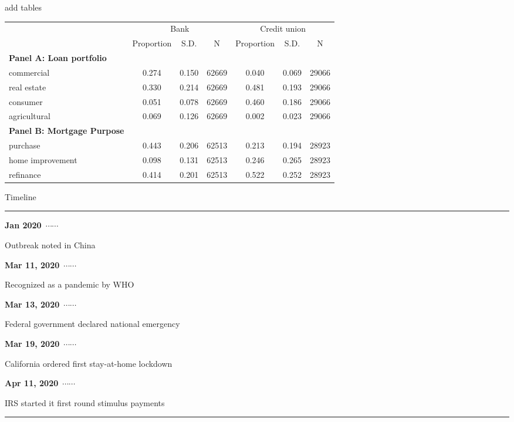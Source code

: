 \documentclass[notes,11pt, aspectratio=169]{beamer}
\newcommand\ytl[2]{
	\parbox[b]{11em}{\hfill{\color{cyan}\bfseries\sffamily #1}~$\cdots\cdots$~}\makebox[0pt][c]{$\bullet$}\vrule\quad \parbox[c]{6cm}{\vspace{8pt}\color{red!40!black!80}\raggedright\sffamily #2}}
\begin{document}
\begin{frame}{add tables}
\begin{table}
\centering
\begin{adjustbox}{max width=0.8\textwidth}
\begin{tabular}{l*{6}{c}}
\toprule
&\multicolumn{3}{c}{Bank}&\multicolumn{3}{c}{Credit union}\\
\cmidrule(lr){2-4}\cmidrule(lr){5-7}
&\multicolumn{1}{c}{Proportion}&\multicolumn{1}{c}{S.D.}&\multicolumn{1}{c}{N}&\multicolumn{1}{c}{Proportion}&\multicolumn{1}{c}{S.D.}&\multicolumn{1}{c}{N} \\
\midrule
  \textbf{Panel A: Loan portfolio} & & & & & & \\
  commercial&       0.274&       0.150&       62669&       0.040&       0.069&       29066\\
  real estate&       0.330&       0.214&       62669&       0.481&       0.193&       29066\\
  consumer&       0.051&       0.078&       62669&       0.460&       0.186&       29066\\
  agricultural&       0.069&       0.126&       62669&       0.002&       0.023&       29066\\
  \midrule
  \textbf{Panel B: Mortgage Purpose} & & & & & & \\
  purchase  &       0.443&       0.206&       62513&       0.213&       0.194&       28923\\
  home improvement &       0.098&       0.131&       62513&       0.246&       0.265&       28923\\
  refinance      &       0.414&       0.201&       62513&       0.522&       0.252&       28923\\
  \bottomrule
\end{tabular}
\end{adjustbox}
\end{table}
\end{frame}


\begin{frame}{Timeline}
\begin{table}
\centering
\begin{minipage}[t]{.9\linewidth}
	\color{gray}
	\rule{\linewidth}{1pt}
	 \ytl{Jan 2020}{Outbreak noted in China}
	 \ytl{Mar 11, 2020}{Recognized as a pandemic by WHO}
	 \ytl{Mar 13, 2020}{Federal government declared national emergency}
	 \ytl{Mar 19, 2020}{California ordered first stay-at-home lockdown}
	 \ytl{Apr 11, 2020}{IRS started it first round stimulus payments}
	\rule{\linewidth}{1pt}%
\end{minipage}%
\end{table}
\end{frame}
\end{document}
